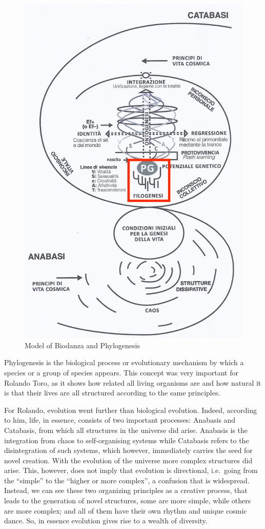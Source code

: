 \documentclass[
  11pt,
]{book}
\begin{document}
\begin{figure}

{\centering \includegraphics[width=0.5\linewidth]{./figs/biologischeAspectenBiodanzaDeelII} 

}

\caption{Model of Biodanza and Phylogenesis}\label{fig:modelPhylo}
\end{figure}

Phylogenesis is the biological process or evolutionary mechanism by which a species or a group of species appears. This concept was very important for Rolando Toro, as it shows how related all living organisms are and how natural it is that their lives are all structured according to the same principles.

For Rolando, evolution went further than biological evolution. Indeed, according to him, life, in essence, consists of two important processes: Anabasis and Catabasis, from which all structures in the universe did arise. Anabasis is the integration from chaos to self-organising systems while Catabasis refers to the disintegration of such systems, which however, immediately carries the seed for novel creation. With the evolution of the universe more complex structures did arise. This, however, does not imply that evolution is directional, i.e.~going from the ``simple'' to the ``higher or more complex'', a confusion that is widespread. Instead, we can see these two organizing principles as a creative process, that leads to the generation of novel structures, some are more simple, while others are more complex; and all of them have their own rhythm and unique cosmic dance. So, in essence evolution gives rise to a wealth of diversity.
\end{document}
